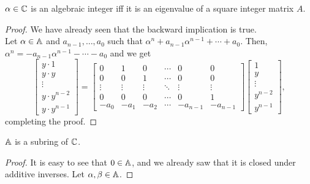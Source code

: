 		\begin{fprop}
			\label{prop: alg int iff integer eigenvalue}
			$\alpha \in \mathbb{C}$ is an algebraic integer iff it is an eigenvalue of a square integer matrix $A$. 
		\end{fprop}
		\begin{proof}
			We have already seen that the backward implication is true.\\
			Let $\alpha \in \mathbb{A}$ and $a_{n-1},\ldots,a_{0}$ such that $\alpha^n + a_{n-1}\alpha^{n-1} + \cdots + a_0$. Then, $\alpha^n = -a_{n-1}\alpha^{n-1}-\cdots-a_0$ and we get
			\[
				\begin{bmatrix}
					y\cdot 1 \\ y \cdot y \\ \vdots \\ y \cdot y^{n-2} \\ y \cdot y^{n-1}
				\end{bmatrix}
				= 
				\begin{bmatrix}
					0 & 1 & 0 & \cdots & 0 & 0 \\
					0 & 0 & 1 & \cdots & 0 & 0 \\
					\vdots & \vdots & \vdots & \ddots & \vdots & \vdots \\
					0 & 0 & 0 & \cdots & 0 & 1 \\
					-a_0 & -a_1 & -a_2 & \cdots & -a_{n-1} & -a_{n-1}
				\end{bmatrix}
				\begin{bmatrix}
					1 \\ y \\ \vdots \\ y^{n-2} \\ y^{n-1}
				\end{bmatrix},
			\]
			completing the proof.
		\end{proof}

		\begin{fprop}
			\label{prop: alg int subring}
			$\mathbb{A}$ is a subring of $\mathbb{C}$.
		\end{fprop}
		\begin{proof}
			It is easy to see that $0 \in \mathbb{A}$, and we already saw that it is closed under additive inverses. Let $\alpha,\beta \in \mathbb{A}$. 
		\end{proof}




\clearpage